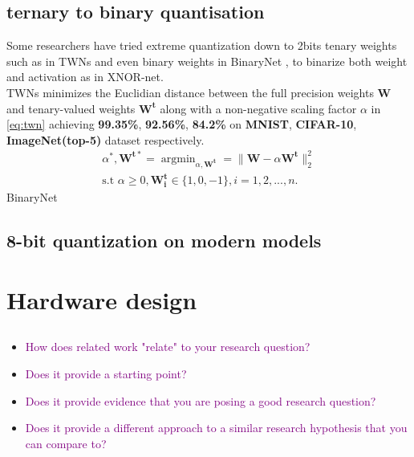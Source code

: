 \subsection{ternary to binary quantisation}
Some researchers have tried extreme quantization down to 2bits tenary weights such as in TWNs\cite{Ternary} and even binary weights in BinaryNet \cite{BinaryNet}, to binarize both weight and activation as in XNOR-net\cite{XnorNet}. \\
TWNs minimizes the Euclidian distance between the full precision weights $\boldsymbol{W}$ and tenary-valued weights $\boldsymbol{W^t}$ along with a non-negative scaling factor $\alpha$ in \eqref{eq:twn} achieving \textbf{99.35\%}, \textbf{92.56\%}, \textbf{84.2\%} on \textbf{MNIST}, \textbf{CIFAR-10}, \textbf{ImageNet(top-5)} dataset respectively.  
\begin{equation}
\begin{aligned}\label{eq:twn}
    \alpha^*, \boldsymbol{W^{t*}} = \mathop{\arg\min}_{\alpha,\boldsymbol{W^t}} = \|\boldsymbol{W}-\alpha\boldsymbol{W^t}\|^2_2 \\  
\text{s.t }\alpha\geq0,\boldsymbol{W^t_i}\in\{1,0,-1\}, i=1,2,...,n.
\end{aligned}
\end{equation}
BinaryNet 


\subsection{8-bit quantization on modern models}
\section{Hardware design}
\subsection{}

\begin{itemize}
    \item \textcolor{purple}{How does related work "relate" to your research question?}
    \item \textcolor{purple}{Does it provide a starting point?}
    \item \textcolor{purple}{Does it provide evidence that you are posing a good research question?}
    \item \textcolor{purple}{Does it provide a different approach to a similar research hypothesis that you can compare to?}
\end{itemize}